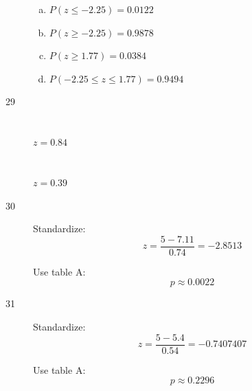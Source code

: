 \documentclass[letterpaper, landscape]{exam}
\begin{document}
\begin{description}
        \begin{enumerate}[(a)]
          \item $P(z \leq -2.25) = \boxed{ 0.0122 }$
          \item $P(z \geq -2.25) = \boxed{ 0.9878 }$
          \item $P(z \geq 1.77) = \boxed{ 0.0384 }$
          \item $P(-2.25 \leq z \leq 1.77) = \boxed{ 0.9494 }$
        \end{enumerate}

      \item[29]
        \begin{parts}
          \part{} $z = 0.84$
          \part{} $z = 0.39$ 
        \end{parts}

      \item[30]
        Standardize:
        \[
          z = \frac{5 - 7.11}{0.74} = -2.8513
        \]

        Use table A:\@
        \[
          p \approx \boxed{ 0.0022 } 
        \]

      \item[31]
        Standardize:
        \[
          z = \frac{5 - 5.4}{0.54} = -0.7407407
        \]

        Use table A:\@
        \[
          p \approx \boxed{ 0.2296 } 
        \]





\end{description}
\end{document}
